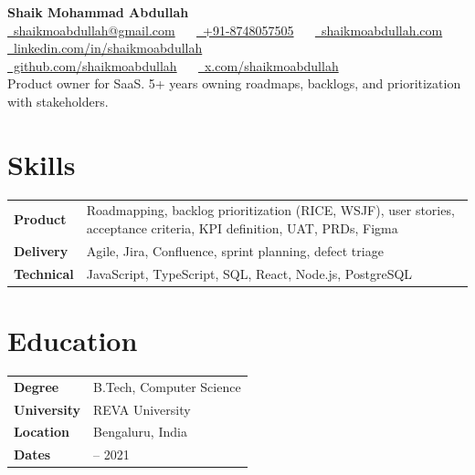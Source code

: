\documentclass[letterpaper,10.5pt]{article}
\newcommand{\skill}[2]{\textbf{#1} & #2 \\}
\begin{document}
\begin{center}
  {\Huge\bfseries Shaik Mohammad Abdullah}\\[5pt]
  {\footnotesize
    \href{mailto:shaikmoabdullah@gmail.com}{\faEnvelope\ shaikmoabdullah@gmail.com} \ \textbar\ %
    \href{https://wa.me/918748057505}{\faWhatsapp\ +91-8748057505} \ \textbar\ %
    \href{https://shaikmoabdullah.com}{\faGlobe\ shaikmoabdullah.com} \ \textbar\ %
    \mbox{\href{https://linkedin.com/in/shaikmoabdullah}{\faLinkedin\ linkedin.com/in/shaikmoabdullah}}\\
    \mbox{\href{https://github.com/shaikmoabdullah}{\faGithub\ github.com/shaikmoabdullah}} \ \textbar\ %
    \mbox{\href{https://x.com/shaikmoabdullah}{\faTwitter\ x.com/shaikmoabdullah}}
  }\\[4pt]
  {\small Product owner for SaaS. 5+ years owning roadmaps, backlogs, and prioritization with stakeholders.}
\end{center}

\noindent
\begin{minipage}[t]{0.66\textwidth}
\section{Skills}
\begin{tabularx}{\linewidth}{@{}l >{\raggedright\arraybackslash}X@{}}
  \skill{Product}{Roadmapping, backlog prioritization (RICE, WSJF), user stories, acceptance criteria, KPI definition, UAT, PRDs, Figma}
  \skill{Delivery}{Agile, Jira, Confluence, sprint planning, defect triage}
  \skill{Technical}{JavaScript, TypeScript, SQL, React, Node.js, PostgreSQL}
\end{tabularx}
\end{minipage}\hfill
\begin{minipage}[t]{0.31\textwidth}
\section{Education}
\begin{tabularx}{\linewidth}{@{}l >{\raggedright\arraybackslash}X@{}}
  \skill{Degree}{B.Tech, Computer Science}
  \skill{University}{REVA University}
  \skill{Location}{Bengaluru, India}
  \skill{Dates}{2017 -- 2021}
\end{tabularx}
\end{minipage}
\end{document}
